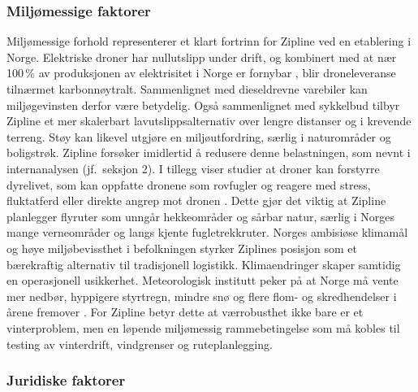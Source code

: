 \subsubsection{Miljømessige faktorer}

Miljømessige forhold representerer et klart fortrinn for Zipline ved en
etablering i Norge. Elektriske droner har nullutslipp under drift, og
kombinert med at nær 100\,\% av produksjonen av elektrisitet i Norge er
fornybar \parencite{fornybarnorge}, blir droneleveranse tilnærmet
karbonnøytralt. Sammenlignet med dieseldrevne varebiler kan miljøgevinsten
derfor være betydelig. Også sammenlignet med sykkelbud tilbyr Zipline et mer
skalerbart lavutslippsalternativ over lengre distanser og i krevende terreng.
Støy kan likevel utgjøre en miljøutfordring, særlig i naturområder og
boligstrøk. Zipline forsøker imidlertid å redusere denne belastningen, som
nevnt i internanalysen (jf.\ seksjon 2). I tillegg viser studier at droner kan
forstyrre dyrelivet,
som kan oppfatte dronene som rovfugler og reagere med
stress, fluktatferd eller direkte angrep mot dronen \parencite{afridi2025}.
Dette gjør det viktig at Zipline planlegger flyruter som unngår hekkeområder
og sårbar natur, særlig i Norges mange verneområder og langs kjente
fugletrekkruter. Norges ambisiøse klimamål og høye miljøbevissthet i
befolkningen styrker Ziplines posisjon som et bærekraftig alternativ til
tradisjonell logistikk. Klimaendringer skaper samtidig en operasjonell
usikkerhet. Meteorologisk institutt peker på at Norge må vente mer nedbør,
hyppigere styrtregn, mindre snø og flere flom- og skredhendelser i årene
fremover \parencite{met2025_klima_norge}. For Zipline betyr dette at
værrobusthet ikke bare er et vinterproblem, men en løpende miljømessig
rammebetingelse som må kobles til testing av vinterdrift, vindgrenser og
ruteplanlegging.

\subsubsection{Juridiske faktorer}

